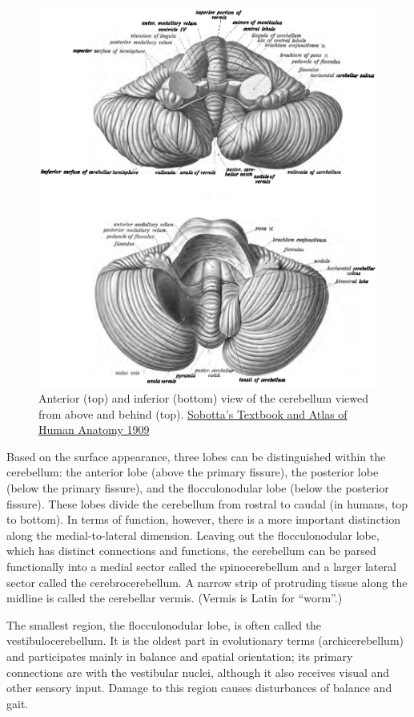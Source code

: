 \begin{figure}

{\centering \includegraphics[width=0.7\linewidth]{./figures/cns/Sobotta_1909_655} 

}

\caption{Anterior (top) and inferior (bottom) view of the cerebellum viewed from above and behind (top). \href{https://commons.wikimedia.org/wiki/File:Sobo_1909_655.png}{Sobotta's Textbook and Atlas of Human Anatomy 1909}}\label{fig:cerebellumanteriorinferior}
\end{figure}

Based on the surface appearance, three lobes can be distinguished within the cerebellum: the anterior lobe (above the primary fissure), the posterior lobe (below the primary fissure), and the flocculonodular lobe (below the posterior fissure). These lobes divide the cerebellum from rostral to caudal (in humans, top to bottom). In terms of function, however, there is a more important distinction along the medial-to-lateral dimension. Leaving out the flocculonodular lobe, which has distinct connections and functions, the cerebellum can be parsed functionally into a medial sector called the spinocerebellum and a larger lateral sector called the cerebrocerebellum. A narrow strip of protruding tissue along the midline is called the cerebellar vermis. (Vermis is Latin for ``worm''.)

The smallest region, the flocculonodular lobe, is often called the vestibulocerebellum. It is the oldest part in evolutionary terms (archicerebellum) and participates mainly in balance and spatial orientation; its primary connections are with the vestibular nuclei, although it also receives visual and other sensory input. Damage to this region causes disturbances of balance and gait.



